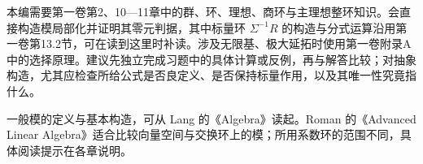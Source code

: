 \ProseParagraphBreak
本编需要第一卷第2、10—11章中的群、环、理想、商环与主理想整环知识。会直接构造模局部化并证明其零元判据，其中标量环 \(\Sigma^{-1}R\) 的构造与分式运算沿用第一卷第13.2节，可在读到这里时补读。涉及无限基、极大延拓时使用第一卷附录A中的选择原理。建议先独立完成习题中的具体计算或反例，再与解答比较；对抽象构造，尤其应检查所给公式是否良定义、是否保持标量作用，以及其唯一性究竟指什么。

\ProseParagraphBreak
一般模的定义与基本构造，可从 Lang 的《Algebra》\cite[CHAPTER III, \S\S 1--3]{Lang2002}读起。Roman 的《Advanced Linear Algebra》\cite[Chapters 3--4]{Roman2008AdvancedLinearAlgebra}适合比较向量空间与交换环上的模；所用系数环的范围不同，具体阅读提示在各章说明。








